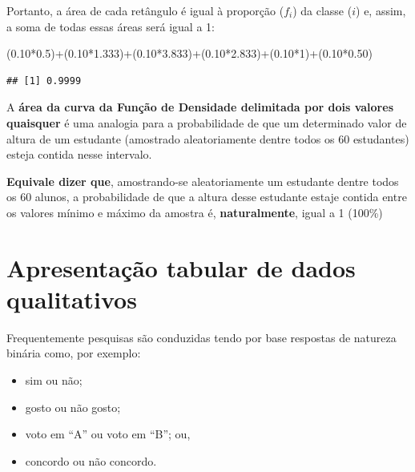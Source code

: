 \documentclass[
]{book}
\newenvironment{Shaded}{\begin{snugshade}}{\end{snugshade}}
\newcommand{\DecValTok}[1]{\textcolor[rgb]{0.00,0.00,0.81}{#1}}
\newcommand{\FloatTok}[1]{\textcolor[rgb]{0.00,0.00,0.81}{#1}}
\newcommand{\NormalTok}[1]{#1}
\newcommand{\SpecialCharTok}[1]{\textcolor[rgb]{0.00,0.00,0.00}{#1}}
\providecommand{\tightlist}{%
  \setlength{\itemsep}{0pt}\setlength{\parskip}{0pt}}
\begin{document}
Portanto, a área de cada retângulo é igual à proporção (\(f_{i}\)) da classe (\(i\)) e, assim, a soma de todas essas áreas será igual a 1:

\hfill\break

\begin{Shaded}
\begin{Highlighting}[]
\NormalTok{(}\FloatTok{0.10}\SpecialCharTok{*}\FloatTok{0.5}\NormalTok{)}\SpecialCharTok{+}\NormalTok{(}\FloatTok{0.10}\SpecialCharTok{*}\FloatTok{1.333}\NormalTok{)}\SpecialCharTok{+}\NormalTok{(}\FloatTok{0.10}\SpecialCharTok{*}\FloatTok{3.833}\NormalTok{)}\SpecialCharTok{+}\NormalTok{(}\FloatTok{0.10}\SpecialCharTok{*}\FloatTok{2.833}\NormalTok{)}\SpecialCharTok{+}\NormalTok{(}\FloatTok{0.10}\SpecialCharTok{*}\DecValTok{1}\NormalTok{)}\SpecialCharTok{+}\NormalTok{(}\FloatTok{0.10}\SpecialCharTok{*}\FloatTok{0.50}\NormalTok{)}
\end{Highlighting}
\end{Shaded}

\begin{verbatim}
## [1] 0.9999
\end{verbatim}

\hfill\break

A \textbf{área da curva da Função de Densidade delimitada por dois valores quaisquer} é uma analogia para a probabilidade de que um determinado valor de altura de um estudante (amostrado aleatoriamente dentre todos os 60 estudantes) esteja contida nesse intervalo.

\textbf{Equivale dizer que}, amostrando-se aleatoriamente um estudante dentre todos os 60 alunos, a probabilidade de que a altura desse estudante estaje contida entre os valores mínimo e máximo da amostra é, \textbf{naturalmente}, igual a 1 (100\%)

\hfill\break

\hypertarget{apresentauxe7uxe3o-tabular-de-dados-qualitativos}{%
\section{Apresentação tabular de dados qualitativos}\label{apresentauxe7uxe3o-tabular-de-dados-qualitativos}}

Frequentemente pesquisas são conduzidas tendo por base respostas de natureza binária como, por exemplo:

\begin{itemize}
\tightlist
\item
  sim ou não;
\item
  gosto ou não gosto;
\item
  voto em ``A'' ou voto em ``B''; ou,
\item
  concordo ou não concordo.
\end{itemize}
\end{document}
